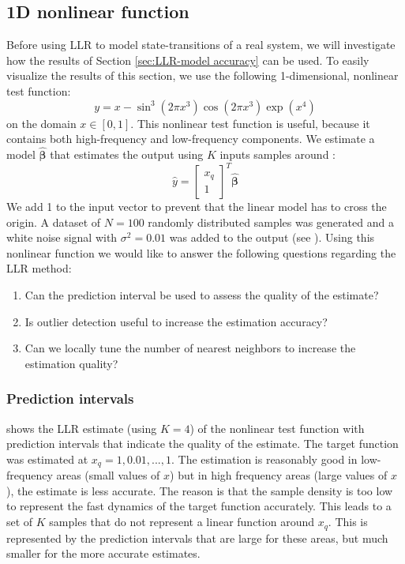 \subsection{1D nonlinear function}\label{sec:LLR-results_nonlinear}
Before using \ac{LLR} to model state-transitions of a real system, we will investigate how the results of Section \ref{sec:LLR-model accuracy} can be used. To easily visualize the results of this section, we use the following 1-dimensional, nonlinear test function: 
\begin{equation}\label{eqn:LLR-nonlinear test function}
		y = x- \sin^3(2\pi x^3) \cos(2\pi x^3) \exp(x^4)
\end{equation}
on the domain $x \in [0, 1]$. This nonlinear test function is useful, because it contains both high-frequency and low-frequency components. We estimate a model $\hat{\bm{\beta}}$ that estimates the output  using $K$ inputs samples around :
$$
	\hat{y} = \begin{bmatrix} x_q \\ 1 \end{bmatrix}^T \hat{\bm{\beta}}
$$
We add 1 to the input vector to prevent that the linear model has to cross the origin. A dataset of $N = 100$ randomly distributed samples was generated and a white noise signal with $\sigma^2 = 0.01$ was added to the output (see ). Using this nonlinear function we would like to answer the following questions regarding the \ac{LLR} method:
\begin{enumerate}
	\item Can the prediction interval be used to assess the quality of the estimate?
	\item Is outlier detection useful to increase the estimation accuracy?
	\item Can we locally tune the number of nearest neighbors to increase the estimation quality?
\end{enumerate}


\subsubsection{Prediction intervals}
 shows the \ac{LLR} estimate (using $K=4$) of the nonlinear test function with prediction intervals that indicate the quality of the estimate. The target function was estimated at $x_q = 1, 0.01, ..., 1$. The estimation is reasonably good in low-frequency areas (small values of $x$) but in high frequency areas (large values of $x$), the estimate is less accurate. The reason is that the sample density is too low to represent the fast dynamics of the target function accurately. This leads to a set of $K$ samples that do not represent a linear function around $x_q$. This is represented by the prediction intervals that are large for these areas, but much smaller for the more accurate estimates. 

